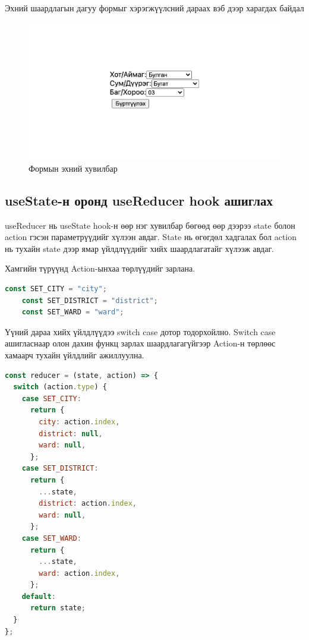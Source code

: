 Эхний шаардлагын дагуу формыг хэрэгжүүлсний дараах вэб дээр харагдах байдал

\begin{figure}
	\centering
	\includegraphics[width=15cm]{images/form-v1.png}
	\caption{Формын эхний хувилбар}
	\label{fig:my_label}
\end{figure}

\pagebreak
\subsection{useState-н оронд useReducer hook ашиглах}

useReducer нь useState hook-н өөр нэг хувилбар бөгөөд өөр дээрээ state болон action гэсэн параметрүүдийг хүлээн авдаг. State нь өгөгдөл хадгалах бол action нь тухайн state дээр ямар үйлдлүүдийг хийх шаардлагатайг хүлээж авдаг. 

Хамгийн түрүүнд Action-ынхаа төрлүүдийг зарлана.

\begin{lstlisting}[language=Javascript, caption=Хийх үйлдлүүдийн төрлийг зарлах, frame=single]
	const SET_CITY = "city";
	const SET_DISTRICT = "district";
	const SET_WARD = "ward";
\end{lstlisting}

Үүний дараа хийх үйлдлүүдээ switch case дотор тодорхойлно. Switch case ашигласнаар олон дахин функц зарлах шаардлагагүйгээр Action-н төрлөөс хамаарч тухайн үйлдлийг ажиллуулна. 

\begin{lstlisting}[language=Javascript, caption=Хийх үйлдлүүдийг тодорхойлох, frame=single]
	const reducer = (state, action) => {
  switch (action.type) {
    case SET_CITY:
      return {
        city: action.index,
        district: null,
        ward: null,
      };
    case SET_DISTRICT:
      return {
        ...state,
        district: action.index,
        ward: null,
      };
    case SET_WARD:
      return {
        ...state,
        ward: action.index,
      };
    default:
      return state;
  }
};
\end{lstlisting}

